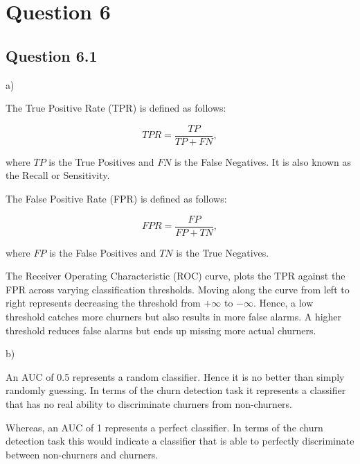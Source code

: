 \section{Question 6}

\subsection{Question 6.1}

\begin{partquestion2}{a)}

The True Positive Rate (TPR) is defined as follows:

\[TPR = \frac{TP}{TP + FN},\]

where $TP$ is the True Positives and $FN$ is the False Negatives. It is also known as
the Recall or Sensitivity. 

The False Positive Rate (FPR) is defined as follows:

\[FPR = \frac{FP}{FP + TN},\]

where $FP$ is the False Positives and $TN$ is the True Negatives.

The Receiver Operating Characteristic (ROC) curve, plots the TPR against the FPR across
varying classification thresholds. Moving along the curve from left to right represents decreasing the threshold from
$+\infty$ to $-\infty$. Hence, a low threshold catches more churners but also results in more
false alarms. A higher threshold reduces false alarms but ends up missing more actual churners.
\end{partquestion2}

\begin{partquestion2}{b)}

An AUC of 0.5 represents a random classifier. Hence it is no better than simply randomly guessing.
In terms of the churn detection task it represents a classifier that has no real ability to 
discriminate churners from non-churners.

Whereas, an AUC of 1 represents a perfect classifier. In terms of the churn detection task
this would indicate a classifier that is able to perfectly discriminate between non-churners
and churners.
\end{partquestion2}

